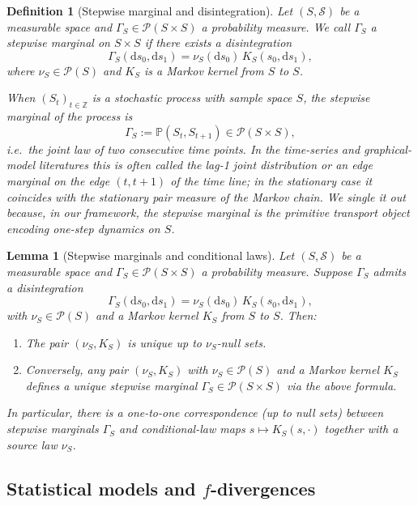 \documentclass[11pt]{article}
\newtheorem{definition}{Definition}
\newtheorem{lemma}{Lemma}
\begin{document}
\begin{definition}[Stepwise marginal and disintegration]
Let $(S,\mathcal{S})$ be a measurable space and
$\Gamma_S \in \mathcal{P}(S\times S)$ a probability measure. We call
$\Gamma_S$ a \emph{stepwise marginal} on $S\times S$ if there exists a
disintegration
\[
  \Gamma_S(\mathrm ds_0,\mathrm ds_1)
  = \nu_S(\mathrm ds_0)\,K_S(s_0,\mathrm ds_1),
\]
where $\nu_S\in\mathcal{P}(S)$ and $K_S$ is a Markov kernel from $S$ to
$S$.

When $(S_t)_{t\in\mathbb{Z}}$ is a stochastic process with sample space
$S$, the stepwise marginal of the process is
\[
  \Gamma_S := \mathbb{P}(S_t,S_{t+1}) \in \mathcal{P}(S\times S),
\]
i.e.\ the joint law of two consecutive time points. In the time-series
and graphical-model literatures this is often called the
\emph{lag-1 joint distribution} or an \emph{edge marginal} on the edge
$(t,t+1)$ of the time line; in the stationary case it coincides with the
stationary pair measure of the Markov chain. We single it out because,
in our framework, the stepwise marginal is the primitive transport
object encoding one-step dynamics on $S$.
\end{definition}

\begin{lemma}[Stepwise marginals and conditional laws]
\label{lem:stepwise-disintegration-uniqueness}
Let $(S,\mathcal{S})$ be a measurable space and 
$\Gamma_S \in \mathcal{P}(S\times S)$ a probability measure.
Suppose $\Gamma_S$ admits a disintegration
\[
  \Gamma_S(\mathrm ds_0,\mathrm ds_1)
  = \nu_S(\mathrm ds_0)\,K_S(s_0,\mathrm ds_1),
\]
with $\nu_S \in \mathcal{P}(S)$ and a Markov kernel $K_S$ from $S$ to $S$.
Then:
\begin{enumerate}[label=(\alph*),leftmargin=1.8em]
  \item The pair $(\nu_S,K_S)$ is unique up to $\nu_S$-null sets.
  \item Conversely, any pair $(\nu_S,K_S)$ with $\nu_S\in\mathcal{P}(S)$
  and a Markov kernel $K_S$ defines a unique stepwise marginal
  $\Gamma_S \in \mathcal{P}(S\times S)$ via the above formula.
\end{enumerate}
In particular, there is a one-to-one correspondence (up to null sets)
between stepwise marginals $\Gamma_S$ and conditional-law maps
$s\mapsto K_S(s,\cdot)$ together with a source law $\nu_S$.
\end{lemma}

\subsection{Statistical models and $f$-divergences}
\end{document}
